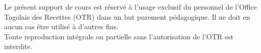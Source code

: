 	\newpage
	\text{} \vspace{7.5cm}
	\begin{center}
		\begin{tcolorbox}[width=0.8\textwidth, colframe=black, colback=gray!10, boxrule=1pt, sharp corners]
			\large Le présent support de cours est réservé à l’usage exclusif du personnel de l’Office Togolais des Recettes (OTR) dans un but purement pédagogique. Il ne doit en aucun cas être utilisé à d’autres fins.\\[0.5cm]
			Toute reproduction intégrale ou partielle sans l’autorisation de l’OTR est interdite.
		\end{tcolorbox}
	\end{center}
		

